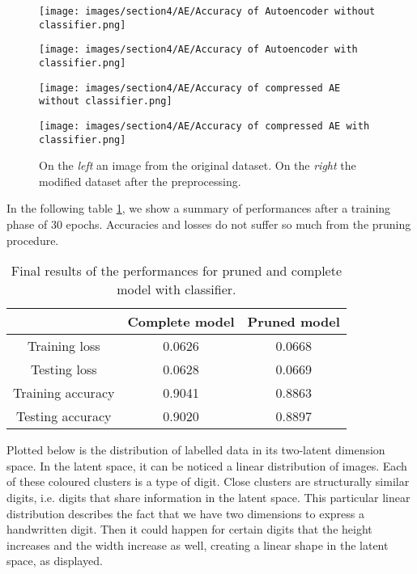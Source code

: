 \documentclass{article}
\begin{document}
\begin{figure}[H]
  \centering
  \begin{minipage}[c]{.4\textwidth}
   {\texttt{[image: images/section4/AE/Accuracy of Autoencoder without classifier.png]}}
    \end{minipage}
    \qquad \qquad
      \begin{minipage}[c]{0.4\textwidth}
  {\texttt{[image: images/section4/AE/Accuracy of Autoencoder with classifier.png]}}
     \end{minipage}
     \quad
  
     \begin{minipage}[c]{0.4\textwidth}
  {\texttt{[image: images/section4/AE/Accuracy of compressed AE without classifier.png]}}
  \end{minipage}
  \qquad \qquad
  \begin{minipage}[c]{0.4\textwidth}
    {\texttt{[image: images/section4/AE/Accuracy of compressed AE with classifier.png]}}
  \end{minipage}
  \quad
     
   \caption{On the \textit{left} an image from the original dataset.
   On the \textit{right} the modified dataset after the preprocessing.}
    \label{fig:accuracy}
\end{figure}

In the following table \ref{tab:results}, we show a summary of performances after a training phase of 30 epochs.
Accuracies and losses do not suffer so much from the pruning procedure.

\begin{table} [H]
  \centering
  \begin{tabular}{| c | c | c |}
  \hline
   & Complete model  &   Pruned model  \\
  \hline 
  \hline
  Training loss & 0.0626 & 0.0668 \\
  \hline
  Testing loss & 0.0628 & 0.0669 \\ 
  \hline
  Training accuracy & 0.9041 & 0.8863 \\ 
  \hline
  Testing accuracy & 0.9020 & 0.8897 \\
  \hline
  \end{tabular}
  \caption{Final results of the performances for pruned and complete model with classifier.}
  \label{tab:results}
\end{table}

Plotted below is the distribution of labelled data in its two-latent dimension space.
In the latent space, it can be noticed a linear distribution of images. 
Each of these coloured clusters is a type of digit. 
Close clusters are structurally similar digits, i.e. digits that share information in the latent space. 
This particular linear distribution describes the fact that we have two dimensions to express a handwritten digit. 
Then it could happen for certain digits that the height increases and the width increase as well, creating a linear shape in the latent space, as displayed. 
\end{document}

